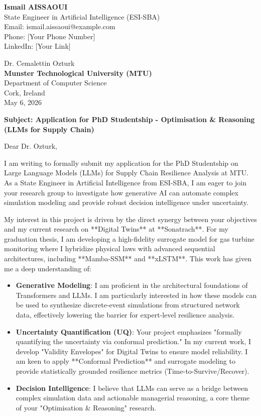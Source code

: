 \documentclass[11pt,a4paper]{article}
\begin{document}
\noindent \textbf{Ismail AISSAOUI} \\
State Engineer in Artificial Intelligence (ESI-SBA) \\
Email: ismail.aissaoui@example.com \\
Phone: [Your Phone Number] \\
LinkedIn: [Your Link]

\bigskip

\begin{flushright}
    Dr. Cemalettin Ozturk \\
    \textbf{Munster Technological University (MTU)} \\
    Department of Computer Science \\
    Cork, Ireland \\
    \medskip
    May 6, 2026
\end{flushright}

\bigskip

\noindent \textbf{Subject: Application for PhD Studentship - Optimisation \& Reasoning (LLMs for Supply Chain)}

\bigskip

Dear Dr. Ozturk,

I am writing to formally submit my application for the PhD Studentship on Large Language Models (LLMs) for Supply Chain Resilience Analysis at MTU. As a State Engineer in Artificial Intelligence from ESI-SBA, I am eager to join your research group to investigate how generative AI can automate complex simulation modeling and provide robust decision intelligence under uncertainty.

My interest in this project is driven by the direct synergy between your objectives and my current research on **Digital Twins** at **Sonatrach**. For my graduation thesis, I am developing a high-fidelity surrogate model for gas turbine monitoring where I hybridize physical laws with advanced sequential architectures, including **Mamba-SSM** and **xLSTM**. This work has given me a deep understanding of:
\begin{itemize}
    \item \textbf{Generative Modeling}: I am proficient in the architectural foundations of Transformers and LLMs. I am particularly interested in how these models can be used to synthesize discrete-event simulations from structured network data, effectively lowering the barrier for expert-level resilience analysis.
    \item \textbf{Uncertainty Quantification (UQ)}: Your project emphasizes "formally quantifying the uncertainty via conformal prediction." In my current work, I develop "Validity Envelopes" for Digital Twins to ensure model reliability. I am keen to apply **Conformal Prediction** and surrogate modeling to provide statistically grounded resilience metrics (Time-to-Survive/Recover).
    \item \textbf{Decision Intelligence}: I believe that LLMs can serve as a bridge between complex simulation data and actionable managerial reasoning, a core theme of your "Optimisation \& Reasoning" research.
\end{itemize}
\end{document}
